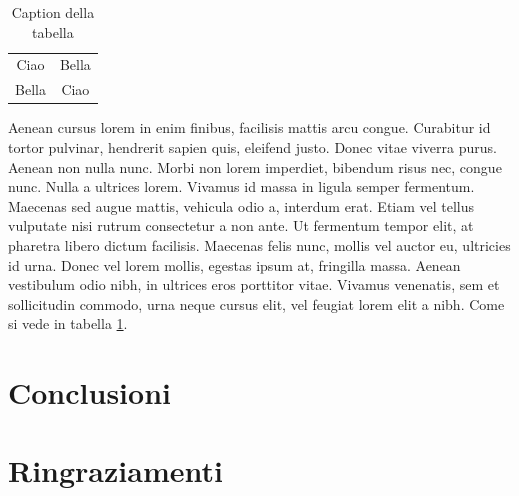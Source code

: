 \documentclass[a4paper, 11pt, oneside]{book}
\begin{document}
\begin{table}[h!]
    \centering
    \begin{tabular}{c|c}
       Ciao  & Bella \\
       Bella  & Ciao
    \end{tabular}
    \caption{Caption della tabella}
    \label{tab:my_label}
\end{table}
Aenean cursus lorem in enim finibus, facilisis mattis arcu congue. Curabitur id tortor pulvinar, hendrerit sapien quis, eleifend justo. Donec vitae viverra purus. Aenean non nulla nunc. Morbi non lorem imperdiet, bibendum risus nec, congue nunc. Nulla a ultrices lorem. Vivamus id massa in ligula semper fermentum. Maecenas sed augue mattis, vehicula odio a, interdum erat. Etiam vel tellus vulputate nisi rutrum consectetur a non ante. Ut fermentum tempor elit, at pharetra libero dictum facilisis. Maecenas felis nunc, mollis vel auctor eu, ultricies id urna. Donec vel lorem mollis, egestas ipsum at, fringilla massa. Aenean vestibulum odio nibh, in ultrices eros porttitor vitae. Vivamus venenatis, sem et sollicitudin commodo, urna neque cursus elit, vel feugiat lorem elit a nibh. Come si vede in tabella \ref{tab:my_label}.

\chapter{Conclusioni}

\chapter{Ringraziamenti}



\printbibliography
\end{document}
